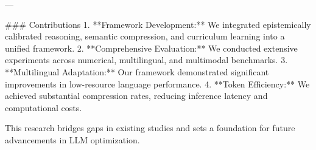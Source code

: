 ---

### Contributions
1. **Framework Development:** We integrated epistemically calibrated reasoning, semantic compression, and curriculum learning into a unified framework.
2. **Comprehensive Evaluation:** We conducted extensive experiments across numerical, multilingual, and multimodal benchmarks.
3. **Multilingual Adaptation:** Our framework demonstrated significant improvements in low-resource language performance.
4. **Token Efficiency:** We achieved substantial compression rates, reducing inference latency and computational costs.

This research bridges gaps in existing studies and sets a foundation for future advancements in LLM optimization.